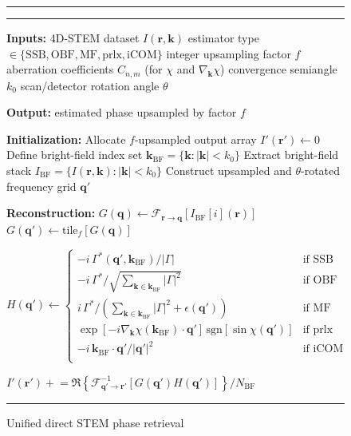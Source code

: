 \documentclass[pdflatex,sn-aps,iicol]{sn-jnl}%
\begin{document}
\begin{figure}
\renewcommand{\figurename}{Algorithm}
\hrule \vspace{5pt}
\caption{Unified direct STEM phase retrieval}
\vspace{5pt} \hrule \vspace{5pt}
\label{unified-pseudocode}
\begin{algorithmic}

\Statex \textbf{Inputs:}
\Statex \quad 4D-STEM dataset $I(\boldsymbol{r},\boldsymbol{k})$
\Statex \quad estimator type $\in\{\text{SSB},\text{OBF},\text{MF},\text{prlx},\text{iCOM}\}$
\Statex \quad integer upsampling factor $f$
\Statex \quad aberration coefficients $C_{n,m}$ (for $\chi$ and $\nabla_{\boldsymbol{k}}\chi$)
\Statex \quad convergence semiangle $k_0$
\Statex \quad scan/detector rotation angle $\theta$

\Statex \textbf{Output:} estimated phase upsampled by factor $f$

\Statex
\Statex \textbf{Initialization:}
\Statex Allocate $f$-upsampled output array $I'(\boldsymbol{r}') \leftarrow 0$
\Statex Define bright-field index set $\boldsymbol{k}_{\mathrm{BF}}=\{\boldsymbol{k}:|\boldsymbol{k}|<k_0\}$
\Statex Extract bright-field stack $I_{\mathrm{BF}}=\{I(\boldsymbol{r},\boldsymbol{k}):|\boldsymbol{k}|<k_0\}$
\Statex Construct upsampled and $\theta$-rotated frequency grid $\boldsymbol{q}'$

\Statex
\Statex \textbf{Reconstruction:}
  \Statex $G(\boldsymbol{q}) \leftarrow \mathcal{F}_{\boldsymbol{r}\rightarrow\boldsymbol{q}}\!\left[I_{\mathrm{BF}}[i](\boldsymbol{r})\right]$
  \Statex $G(\boldsymbol{q}') \leftarrow \mathrm{tile}_f\!\left[G(\boldsymbol{q})\right]$

  \Statex $H(\boldsymbol{q}')\leftarrow \begin{cases}
    -i\,\Gamma^*(\boldsymbol{q}',\boldsymbol{k}_{\mathrm{BF}})/|\Gamma| & \text{if SSB} \\
    -i\,\Gamma^*/\sqrt{\sum_{\boldsymbol{k}\in\boldsymbol{k}_{\mathrm{BF}}}|\Gamma|^2} & \text{if OBF} \\
    i\,\Gamma^*/\left(\sum_{\boldsymbol{k}\in\boldsymbol{k}_{\mathrm{BF}}}|\Gamma|^2+\epsilon(\boldsymbol{q}')\right) & \text{if MF} \\
    \exp[-i\nabla_{\boldsymbol{k}}\chi(\boldsymbol{k}_{\mathrm{BF}})\!\cdot\!\boldsymbol{q}']\,\mathrm{sgn}[\sin\chi(\boldsymbol{q}')] & \text{if prlx} \\
    -i\,\boldsymbol{k}_{\mathrm{BF}}\!\cdot\!\boldsymbol{q}'/|\boldsymbol{q}'|^2 & \text{if iCOM} \\
  \end{cases}$

  \Statex $I'(\boldsymbol{r}') \mathrel{+}= \Re\!\left\{\mathcal{F}^{-1}_{\boldsymbol{q}'\rightarrow\boldsymbol{r}'}[G(\boldsymbol{q}')H(\boldsymbol{q}')]\right\}/N_{\mathrm{BF}}$
\EndFor

\end{algorithmic}
\vspace{5pt} \hrule
\end{figure}
\end{document}
